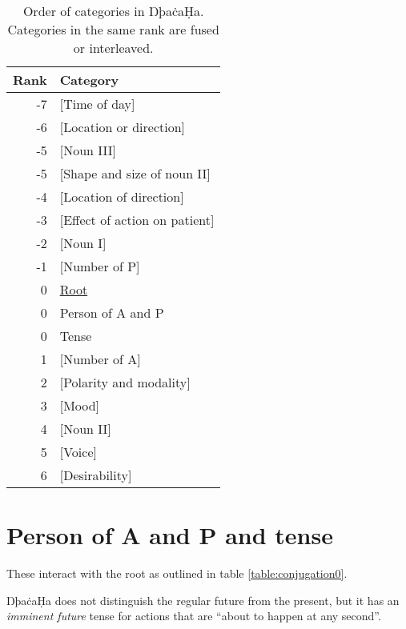 \documentclass{book}
\newcommand{\lname}{ŊþaċaḤa}
\begin{document}
\begin{table}[ht]
  \caption{Order of categories in \lname. Categories in the same rank are fused or interleaved.}
  \centering
  \begin{tabular}{r|l}
    Rank & Category \\
    \hline
    -7 & [Time of day] \\
    -6 & [Location or direction] \\
    -5 & [Noun III] \\
    -5 & [Shape and size of noun II] \\
    -4 & [Location of direction] \\
    -3 & [Effect of action on patient] \\
    -2 & [Noun I] \\
    -1 & [Number of P] \\
    0 & \underline{Root} \\
    0 & Person of A and P \\
    0 & Tense \\
    1 & [Number of A] \\
    2 & [Polarity and modality] \\
    3 & [Mood] \\
    4 & [Noun II] \\
    5 & [Voice] \\
    6 & [Desirability] \\
  \end{tabular}
\end{table}

\section{Person of A and P and tense}

These interact with the root as outlined in table \ref{table:conjugation0}.

\lname{} does not distinguish the regular future from the present, but it has an \emph{imminent future} tense for actions that are ``about to happen at any second''.
\end{document}

